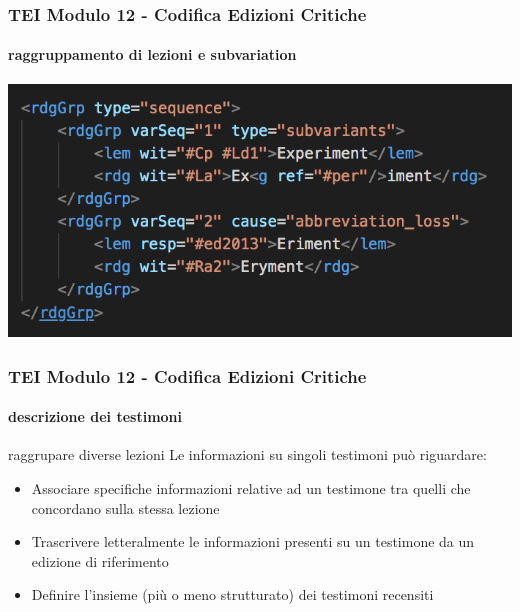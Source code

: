 \begin{frame}
    \frametitle{TEI Modulo 12 - Codifica Edizioni Critiche}
    \framesubtitle{raggruppamento di lezioni e subvariation}
    \addtocounter{nframe}{1}
    

    \begin{center}
        \includegraphics[width=.95\textwidth]{imgs/rdgGrp-seq.png}
    \end{center}


\end{frame}



\begin{frame}
    \frametitle{TEI Modulo 12 - Codifica Edizioni Critiche}
    \framesubtitle{descrizione dei testimoni}
    \addtocounter{nframe}{1}

    \begin{block}{raggrupare diverse lezioni}
      Le informazioni su singoli testimoni può riguardare:
      \begin{itemize}
          \item Associare specifiche informazioni relative ad un testimone tra quelli che concordano sulla stessa lezione
          \item Trascrivere letteralmente le informazioni presenti su un testimone da un edizione di riferimento
          \item Definire l'insieme (più o meno strutturato) dei testimoni recensiti
      \end{itemize}
    \end{block}

\end{frame}



